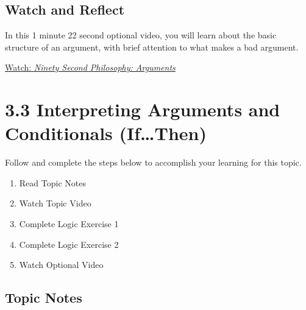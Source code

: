 \documentclass[
]{book}
\providecommand{\tightlist}{%
  \setlength{\itemsep}{0pt}\setlength{\parskip}{0pt}}
\begin{document}
\begin{reflect}
\end{reflect}

\hypertarget{watch-and-reflect-18}{%
\subsection*{Watch and Reflect}\label{watch-and-reflect-18}}

\begin{reflect}
In this 1 minute 22 second optional video, you will learn about the basic structure of an argument, with brief attention to what makes a bad argument.

\href{https://www.youtube.com/watch?v=Z7f_uuy1JcM}{Watch: \emph{Ninety Second Philosophy: Arguments}}
\end{reflect}

\hypertarget{interpreting-arguments-and-conditionals-ifthen}{%
\section*{3.3 Interpreting Arguments and Conditionals (If\ldots Then)}\label{interpreting-arguments-and-conditionals-ifthen}}

Follow and complete the steps below to accomplish your learning for this topic.

\begin{enumerate}
\def\labelenumi{\arabic{enumi}.}
\tightlist
\item
  Read Topic Notes
\item
  Watch Topic Video
\item
  Complete Logic Exercise 1
\item
  Complete Logic Exercise 2
\item
  Watch Optional Video
\end{enumerate}

\hypertarget{topic-notes-10}{%
\subsection*{Topic Notes}\label{topic-notes-10}}
\end{document}
